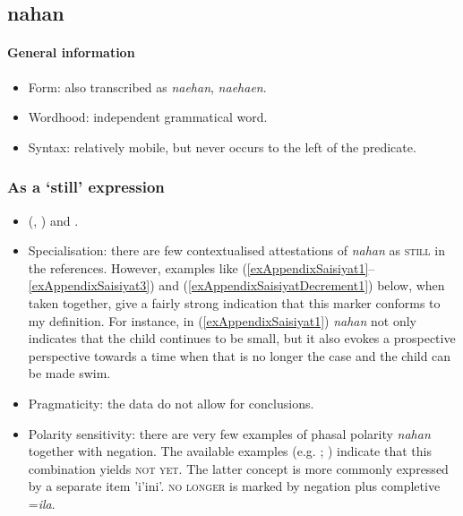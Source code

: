 \subsection{nahan}
\paragraph{General information}
\begin{itemize}
	\item Form: also transcribed as \textit{naehan}, \textit{naehaen}.
	\item Wordhood: independent grammatical word.
	\item Syntax: relatively mobile, but never occurs to the left of the predicate.
\end{itemize}

\subsubsection{As a \lq{}still\rq{ }expression}
\begin{itemize}
	\item \citeauthor{Huang2007} (\citeyear{Huang2007}, \citeyear[109–110]{Huang2008}) and \textcite[154–155]{ZeitounEtal2015}.
	\item Specialisation: there are few contextualised attestations of \textit{nahan} as \textsc{still} in the references. However, examples like (\ref{exAppendixSaisiyat1}–\ref{exAppendixSaisiyat3}) and (\ref{exAppendixSaisiyatDecrement1}) below, when taken together, give a fairly strong indication that this marker conforms to my definition. For instance, in (\ref{exAppendixSaisiyat1}) \textit{nahan} not only indicates that the child continues to be small, but it also evokes a prospective perspective towards a time when that is no longer the case and the child can be made swim. 
	\item Pragmaticity: the data do not allow for conclusions.
	\item Polarity sensitivity: there are very few examples of phasal polarity \textit{nahan} together with negation. The available examples (e.g. \cite[118]{Huang2008}; \cite[529]{ZeitounEtal2015}) indicate that this combination yields \textsc{not yet}. The latter concept is more commonly expressed by a separate item \textit{}\rq{}i\rq{}ini\rq{}. \textsc{no longer} is marked by negation plus completive \mbox{=\textit{ila}}.
\end{itemize}

